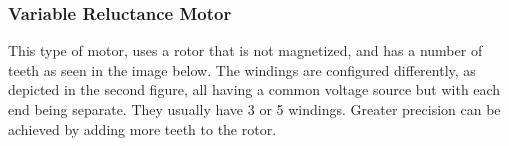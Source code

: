 \begin{figure}[htp] 
    \centering
    \hfill
    \hfill
  	\hfill
\end{figure}
\subsubsection{Variable Reluctance Motor}
This type of motor, uses a rotor that is not magnetized, and has a number of teeth as seen in the image below. The windings are configured differently, as depicted in the second figure, all having a common voltage source but with each end being separate. They usually have 3 or 5 windings. Greater precision can be achieved by adding more teeth to the rotor.

